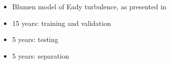 \begin{minipage}{.39\textwidth}
    \begin{itemize}
        \item Blumen model of Eady turbulence, as presented in\\
            \cite{tulloch_note_2009}
        \item 15 years: training and validation
        \item 5 years: testing
        \item 5 years: separation
    \end{itemize}
\end{minipage}
